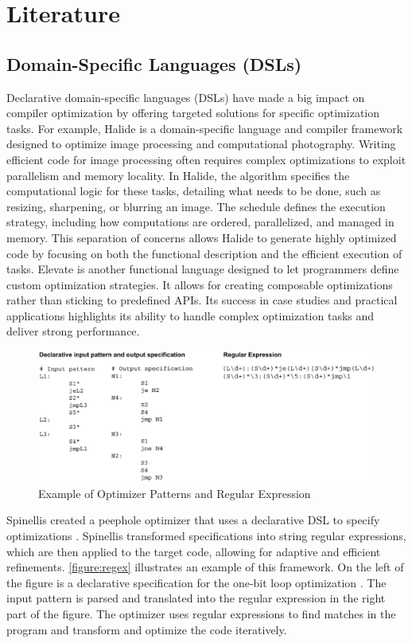 \chapter[Literature Review]{Literature}

\section{Domain-Specific Languages (DSLs)}
Declarative domain-specific languages (DSLs) have made a big impact on compiler optimization by offering targeted solutions for specific optimization tasks. For example, Halide \cite{Jonathan2018} is a domain-specific language and compiler framework designed to optimize image processing and computational photography. Writing efficient code for image processing often requires complex optimizations to exploit parallelism and memory locality. In Halide, the algorithm specifies the computational logic for these tasks, detailing what needs to be done, such as resizing, sharpening, or blurring an image. The schedule defines the execution strategy, including how computations are ordered, parallelized, and managed in memory. This separation of concerns allows Halide to generate highly optimized code by focusing on both the functional description and the efficient execution of tasks. Elevate \cite{Hagedorn2020} is another functional language designed to let programmers define custom optimization strategies. It allows for creating composable optimizations rather than sticking to predefined APIs. Its success in case studies and practical applications highlights its ability to handle complex optimization tasks and deliver strong performance.

\begin{figure}[h]
    \centering
    \includegraphics[width=1\textwidth]{Packages/regex.png}
    \caption{Example of Optimizer Patterns and Regular Expression \cite{Spinellis1999}}
    \label{figure:regex}
\end{figure}

Spinellis created a peephole optimizer that uses a declarative DSL to specify optimizations \cite{Spinellis1999}. Spinellis transformed specifications into string regular expressions, which are then applied to the target code, allowing for adaptive and efficient refinements. \autoref{figure:regex} illustrates an example of this framework. On the left of the figure is a declarative specification for the one-bit loop optimization \cite{Spinellis1999}. The input pattern is parsed and translated into the regular expression in the right part of the figure. The optimizer uses regular expressions to find matches in the program and transform and optimize the code iteratively.
